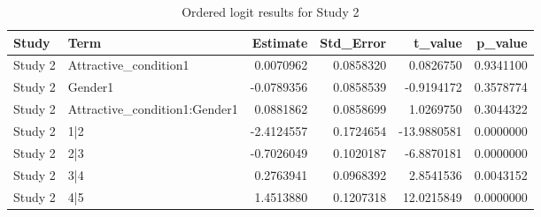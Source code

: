 \begin{table}

\caption{Ordered logit results for Study 2}
\centering
\begin{tabular}[t]{llrrrr}
\toprule
Study & Term & Estimate & Std\_Error & t\_value & p\_value\\
\midrule
Study 2 & Attractive\_condition1 & 0.0070962 & 0.0858320 & 0.0826750 & 0.9341100\\
Study 2 & Gender1 & -0.0789356 & 0.0858539 & -0.9194172 & 0.3578774\\
Study 2 & Attractive\_condition1:Gender1 & 0.0881862 & 0.0858699 & 1.0269750 & 0.3044322\\
Study 2 & 1|2 & -2.4124557 & 0.1724654 & -13.9880581 & 0.0000000\\
Study 2 & 2|3 & -0.7026049 & 0.1020187 & -6.8870181 & 0.0000000\\
\addlinespace
Study 2 & 3|4 & 0.2763941 & 0.0968392 & 2.8541536 & 0.0043152\\
Study 2 & 4|5 & 1.4513880 & 0.1207318 & 12.0215849 & 0.0000000\\
\bottomrule
\end{tabular}
\end{table}
